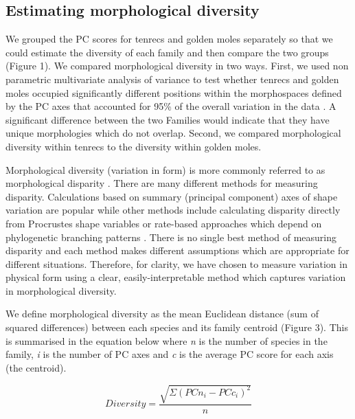 \documentclass[12pt,a4paper]{article}
\begin{document}
\subsection{Estimating morphological diversity}
	
	We grouped the PC scores for tenrecs and golden moles separately so that we could estimate the diversity of each family and then compare the two groups (Figure 1). We compared morphological diversity in two ways. First, we used non parametric multivariate analysis of variance \citep[npMANOVA;][]{Anderson2001} to test whether tenrecs and golden moles occupied significantly different positions within the morphospaces defined by the PC axes that accounted for 95\% of the overall variation in the data \citep[e.g.][]{Serb2011, Ruta2013}. A significant difference between the two Families would indicate that they have unique morphologies which do not overlap. Second, we compared morphological diversity within tenrecs to the diversity within golden moles. 
	
	Morphological diversity (variation in form) is more commonly referred to as morphological disparity \citep{Foote1997}. There are many different methods for measuring disparity. Calculations based on summary (principal component) axes of shape variation are popular \citep[e.g.][]{Ruta2013, Foth2012, Brusatte2008, Wainwright2007} while other methods include calculating disparity directly from Procrustes shape variables \citep{Zelditch2012} or rate-based approaches which depend on phylogenetic branching patterns \citep[e.g.][]{Price2013, Price2010, OMeara2006}. There is no single best method of measuring disparity \citep{Ciampaglio2001} and each method makes different assumptions which are appropriate for different situations. Therefore, for clarity, we have chosen to measure variation in physical form using a clear, easily-interpretable method which captures variation in morphological diversity. 	
	
	We define morphological diversity as the mean Euclidean distance (sum of squared differences) between each species and its family centroid (Figure 3). This is summarised in the equation below where \textit{n} is the number of species in the family, \textit{i} is the number of PC axes and \textit{c} is the average PC score for each axis (the centroid). 
	
	\begin{equation}
		Diversity = \frac{\sqrt{\Sigma(PCn_{i}-PCc_{i})^2}}{n}
	\end{equation}
\end{document}
